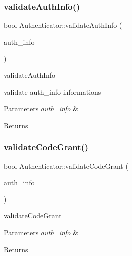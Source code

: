 \subsubsection{\texorpdfstring{validate\+Auth\+Info()}{validateAuthInfo()}}
{\footnotesize\ttfamily bool Authenticator\+::validate\+Auth\+Info (\begin{DoxyParamCaption}\item[{\hyperlink{classAuth_1_1AuthInfo}{Auth\+Info} $\ast$}]{auth\+\_\+info }\end{DoxyParamCaption})}



validate\+Auth\+Info 

validate auth\+\_\+info informations 
\begin{DoxyParams}{Parameters}
{\em auth\+\_\+info} & \\
\hline
\end{DoxyParams}
\begin{DoxyReturn}{Returns}

\end{DoxyReturn}
\mbox{\label{classAuth_1_1Authenticator_aeb9ff1428b63189a816d113f1dcdc4f1}} 
\subsubsection{\texorpdfstring{validate\+Code\+Grant()}{validateCodeGrant()}}
{\footnotesize\ttfamily bool Authenticator\+::validate\+Code\+Grant (\begin{DoxyParamCaption}\item[{\hyperlink{classAuth_1_1AuthInfo}{Auth\+Info} $\ast$}]{auth\+\_\+info }\end{DoxyParamCaption})\hspace{0.3cm}{\ttfamily [protected]}}



validate\+Code\+Grant 


\begin{DoxyParams}{Parameters}
{\em auth\+\_\+info} & \\
\hline
\end{DoxyParams}
\begin{DoxyReturn}{Returns}

\end{DoxyReturn}
\mbox{\label{classAuth_1_1Authenticator_a9e817e28311f11dcdf59ed637d28319f}} 

